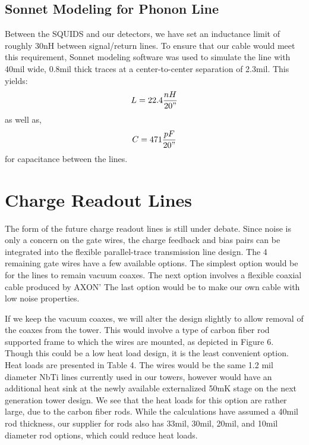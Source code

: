 \documentclass{report}
\begin{document}

\newpage
\subsection{Sonnet Modeling for Phonon Line}
Between the SQUIDS and our detectors, we have set an inductance limit of roughly 30nH between signal/return lines. To ensure that our cable would meet this requirement, Sonnet modeling software was used to simulate the line with 40mil wide, 0.8mil thick traces at a center-to-center separation of 2.3mil. This yields:
$$
L = 22.4\frac{nH}{20"}
$$
as well as,
$$
C = 471\frac{pF}{20"}
$$
for capacitance between the lines.

\section{Charge Readout Lines}

The form of the future charge readout lines is still under debate. Since noise is only a concern on the gate wires, the charge feedback and bias pairs can be integrated into the flexible parallel-trace transmission line design. The 4 remaining gate wires have a few available options. The simplest option would be for the lines to remain vacuum coaxes. The next option involves a flexible coaxial cable produced by AXON' The last option would be to make our own cable with low noise properties.

If we keep the vacuum coaxes, we will alter the design slightly to allow removal of the coaxes from the tower. This would involve a type of carbon fiber rod supported frame to which the wires are mounted, as depicted in Figure 6. Though this could be a low heat load design, it is the least convenient option. Heat loads are presented in Table 4. The wires would be the same 1.2 mil diameter NbTi lines currently used in our towers, however would have an additional heat sink at the newly available externalized 50mK stage on the next generation tower design. We see that the heat loads for this option are rather large, due to the carbon fiber rods. While the calculations have assumed a 40mil rod thickness, our supplier for rods also has 33mil, 30mil, 20mil, and 10mil diameter rod options, which could reduce heat loads.
\end{document}
